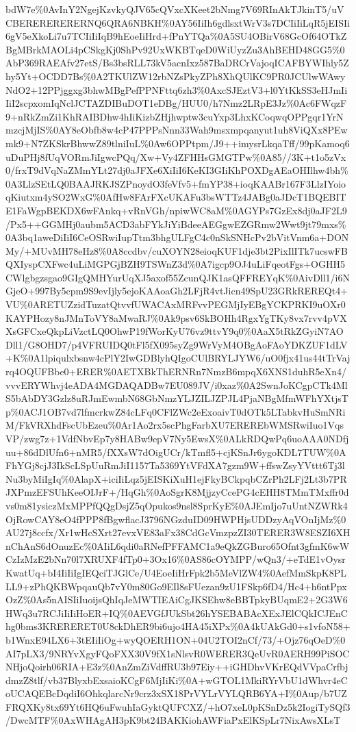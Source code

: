 \documentclass[]{article}
\begin{document}
bdW7e\%0AvInY2NgejKzvkyQJV65cQVxcXKeet2bNmg7V69RInAkTJkinT5/uVCBERERERERERNQ6QRA6NBKH\%0AY56IiIh6gdlsxtWrV3s7DCIiIiLqR5jEISIi6gV5eXkoLi7u7TCIiIiIqB9hEoeIiHrd+fPnYTQa\%0A5SU4OBirV68GcOf64OTkZBgMBrkMAOLi4pCSkgKj0ShPv92UxWKBTqeD0WiUyzZu3AhBEHD48GG5\%0AbP369RAEAfv27etS/Bs3bsRLL73kV5acnIxz587BaDRCrVajoqICAFBYWIhly5Zhy5Yt+OCDD7Bs\%0A2TKUlZW12rbNZsPkyZPh8XhQUlKC9PR0JCUlwWAwyNdO2+12PPjggxg3bhwMBgPefPPNFttq6zh3\%0AxcSJEztV3+l0YtKkSS3eHJmIiIiI2scpxomIqNclJCTAZDIBuDOT1eDBg/HUU0/h7Nmz2LRpE3Jz\%0Ac6FWqzF9+nRkZmZi1KhRAIBDhw4hIiKizbZHjhwptw3cuYxp3LhxKCoqwqOPPgqr1YrNmzcjMjIS\%0AY8eObfb8w4cP47PPPsNnn33Wah9msxmpqanyut1uh8ViQXx8PEwmk9+N7ZKSkrBhwwZ89tlniIuL\%0Aw6OPPtpm/J9++imysrLkqaTff/99pKamoq6uDuPHj8fUqVORmJiIgwcPQq/Xw+Vy4ZFHHsGMGTPw\%0A85//3K+t1o5zVx0/frxT9dVqNaZMmYLt27dj0aJFXe6XiIiI6KeKI3GIiKhPOXDgAEaOHIlhw4bh\%0A3LlzSEtLQ0BAAJRKJSZPnoydO3feVfv5+fmYP38+ioqKAABr167F3LlzIYoioqKiutxm4ySO2WxG\%0AfHw8FArFXcUKAFu3bsWTTz4JABg0aJDcT1BQEBITE1FaWgpBEKDX6wFAnkq+vRnVGh/npiwWC8aM\%0AGYPs7GzEx8dj0aJF2L9/Px5++GGMHj0aubm5ACD3abFYkJiYiBdeeAEGgwEZGRmw2Wwt9jt79mxs\%0A3bq1aweDiIiI6CeOSRwiIupTtm3bhgULFgC4c0nSkSNHcPv2bVitVnm6a+DONMy/+MUvMH78eHz8\%0A8ccdbv/cuXOYN28eioqKUF1dje3bt2PixIlITk7ucswFBQXIyspCXFwc4uLiMGPGjBZH9TSWnZ3d\%0A7igcp9OJ4uLiFqeotFgs+OGHH5CWlgbgzsgao9GIgQMHYurUqXJ5axof55ZcunQJK1asQFFREYqK\%0AivDll1/i6NGjeO+997By5cpm9S9evIjly5ejoKAAoaGh2LFjR4vtJicn49SpU23GRkREREQt4+VU\%0ARETUZzidTuzatQtvvfUWACAxMRFvvPEGMjIyEBgYCKPRKI9uOXr0KAYPHozy8nJMnToVY8aMwaRJ\%0Ak9psv6SkBOHh4RgxYgTKy8vx7rvv4pVXXsGFCxeQkpLiVzctLQ0OhwP19fWorKyU76vz9ttvY9q0\%0AaX5tRkZGyiN7AODll1/G8OHD7/p4VFRUIDQ0tFl5fX095syZg9WrVyM4OBgAoFAoYDKZUF1dLV+K\%0A1lpiqulxbsnw4cPlY2IwGDBlyhQIgoCUlBRYLJYW6/uO0fjx41us44tTrVajrq4OQUFBbe0+ERER\%0AETXBkThERNRn7NmzB6mpqX6XNS1duhR5eXn4/vvvERYWhvj4eADA4MGDAQADBw7EU089JV/i0xaz\%0A2SwnJoKCgpCTk4MlS5bAbDY3Gzlz8uRJmEwmbN68GbNmzYLJZILJZPJL4PjaNBgMfmWFhYXtjsTp\%0ACJ1OB7vd7lfmcrkwZ84cLFq0CFlZWc2eExoaivT0dOTk5LTabkvHuSmNRiM/FkVRXhdFscUbEzeu\%0Ar1Ao2rx5scPhgFarbXU7EREREbWMSRwiIuo1VqsVP/zwg7z+1VdfNbvEp7y8HABw9epV7Ny5EwsX\%0ALkRDQwPq6uoAAA0NDfjuu+86dDlUfn6+nMR5/fXXsW7dOigUCr/kTmfl5+cjKSnJr6ygoKDL7TUW\%0AFhYGj8cjJ3IkScLSpUuRmJiI1157Ta5369YtVFdXA7gzm9W+ffswZsyYVttt6Tj3lNu3byMiIgIq\%0AlapX+iciIiLqz5jEISKiXuH1ejFkyBCkpqbCZrPh2LFj2Lt3b7PRJXPmzEFSUhKeeOIJrF+/HqGh\%0AoSgrK8MjjzyCcePG4cEHH8TMmTMxffr0dvs0m81ysiczMxMPPfQQgDsjZ5qOpukos9nsl8SprKyE\%0AJEmIjo7uUntNZWRk4OjRowCAY8eO4fPPP8fBgwflacJ3796NGzduID09HWPHjsUDDzyAqVOnIjMz\%0AU27j8ccfx/Xr1wHcSXrt27evxVE83aFx38CdGcVmzpzZI30TERER3W8ESZI6XHnChAnS6dOnuzEc\%0AIiL6qdi0aRNefPFFAMC1a9eQkZGBuro65Ofnt3gfmK6wWCzIzMzE2bNn70l7XRUXF4fTp0+3Ox16\%0AS86cOYMPP/wQn3/+eTdE1vOysrKwatUq+bI4IiIiIgIEQciTJGlCe/U4EoeIiHrFpk2b5MeVlZW4\%0AefMmSkpK8PLLL9+zPhQKBWpqauQb7vY0m80Go9EIl8sFUezan9zU1FSkp6fD4/Hc4+h6ntPpxOzZ\%0As5nAISIiIuoijsQhIqJeMWTIEAiCgJKSEhw8eBBTpkyBUqmE2+2G3W6HWq3u7RCJiIiIiHoER+IQ\%0AEVGfJUkSbt26hYSEBABAcXExJElCQkICJEnChg0bms3KRERERET0U8ckDhER9bi6ujo4HA45iXPx\%0A4kUAkGd0+s1vfoN58+b1WnxE94LX6+3tEIiIiOg+wyQOERH1ON+04U2TOI2nCf/73/+Ojz76qOeD\%0AI7pLX3/9NRYvXgyFQoFXX30V9fX1sNlsvR0WERER3QeUvR0AERH99PiSOCNHjoQoirh06RIA+E3z\%0AnZmZiVdffRU3b97Eiy++iGHDhvVKrEQdVVpaCrfbjdmzZ8tlf/vb37BlyxbExsaioKCgF6MjIiKi\%0A+wGTOL1MkiRYrVbU1dWhvr4eCoUCAQEBcDqdiI6OhkqlarcNr9crz3xSX18PrVYLrVYLQRB6YA+I\%0Aup/b7UZFRQXKy8tx69Yt6HQ6uFwuhIaGyktQUFCXZ/+hO7xeL0pKSnDz5k2IogiTySQf3/DwcMTF\%0AxWHAgAH3pK9bt24BAKKiohAWFiaPxElKSpLr7NixAwsXLsT
\end{document}
